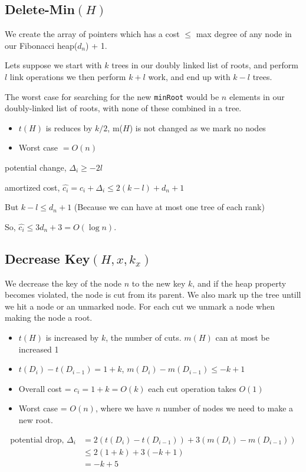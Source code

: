 \documentclass[a4paper,oneside,11pt]{article}
\begin{document}
\subsection*{Delete-Min$(H)$}
We create the array of pointers which has a cost $\leq$ max degree of any node in our Fibonacci heap($d_n$) + 1.

Lets suppose we start with $k$ trees in our doubly linked list of roots, and perform $l$ link operations we then perform $k+l$ work, and end up with $k-l$ trees.

The worst case for searching for the new \texttt{minRoot} would be $n$ elements in our doubly-linked list of roots, with none of these combined in a tree.
\begin{itemize}
\item{$t(H)$ is reduces by $k/2$, m($H$) is not changed as we mark no nodes}
\item{Worst case} $= O(n)$
\end{itemize}

potential change, $\Delta_i \geq -2l$

amortized cost, $\hat{c_i} = c_i + \Delta_i \leq 2(k - l) + d_n + 1$

But $k - l\leq d_n + 1$ (Because we can have at most one tree of each rank)

So, $\hat{c_i}\leq 3d_n + 3 = O(\log n)$.

\subsection*{Decrease Key$(H, x, k_x)$}
We decrease the key of the node $n$ to the new key $k$, and if the heap property becomes violated, the node is cut from its parent.
We also mark up the tree untill we hit a node or an unmarked node. For each cut we unmark a node when making the node a root.
\begin{itemize}
\item{$t(H)$ is increased by $k$, the number of cuts. $m(H)$ can at most be increased 1}
\item{$t(D_i)-t(D_{i-1}) = 1 + k$, $m(D_i)-m(D_{i-1})\leq -k+1$}
\item{Overall cost} = $c_i = 1 + k = O(k)$ each cut operation takes $O(1)$
\item{Worst case} = $O(n)$, where we have $n$ number of nodes we need to make a new root.
\end{itemize}

\begin{align*}
\text{potential drop, } \Delta_i &= 2(t(D_i)-t(D_{i-1}))+3(m(D_i)-m(D_{i-1}))\\
&\leq 2(1+k)+3(-k+1)\\
&= -k+5
\end{align*}
\end{document}
